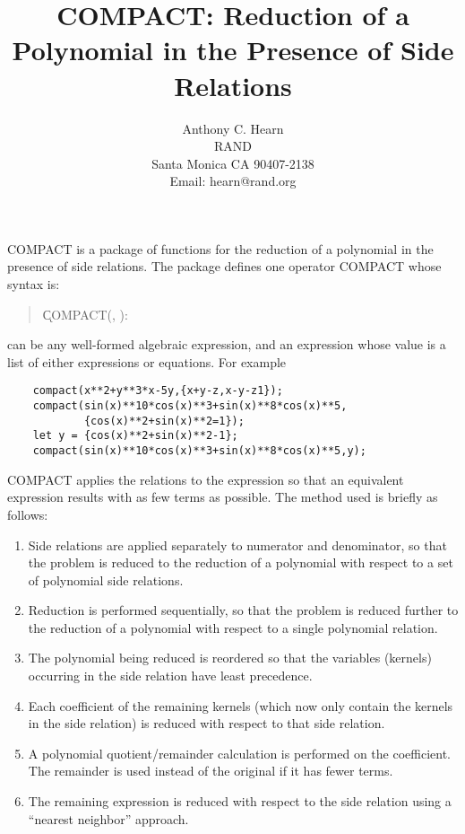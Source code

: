 \title{COMPACT: Reduction of a Polynomial in the Presence of Side Relations}
\date{}
\author{Anthony C. Hearn\\ RAND\\
Santa Monica CA 90407-2138\\
Email: hearn@rand.org}

\maketitle

  
{COMPACT} is a package of functions for the reduction of a polynomial in
the presence of side relations.  The package defines one operator {COMPACT}
whose syntax is:

\begin{quote}
\k{COMPACT}(, ):
\end{quote}

 can be any well-formed algebraic expression, and
 an expression whose value is a list
of either expressions or equations.  For example

\begin{verbatim}
    compact(x**2+y**3*x-5y,{x+y-z,x-y-z1});
    compact(sin(x)**10*cos(x)**3+sin(x)**8*cos(x)**5,
            {cos(x)**2+sin(x)**2=1});
    let y = {cos(x)**2+sin(x)**2-1};
    compact(sin(x)**10*cos(x)**3+sin(x)**8*cos(x)**5,y);
\end{verbatim}

{COMPACT} applies the relations to the expression so that an equivalent
expression results with as few terms as possible.  The method used is
briefly as follows:

\begin{enumerate}
\item Side relations are applied separately to numerator and denominator, so
that the problem is reduced to the reduction of a polynomial with respect to
a set of polynomial side relations.

\item Reduction is performed sequentially, so that the problem is reduced
further to the reduction of a polynomial with respect to a single
polynomial relation.

\item The polynomial being reduced is reordered so that the variables
(kernels) occurring in the side relation have least precedence.

\item Each coefficient of the remaining kernels (which now only contain
the kernels
in the side relation) is reduced with respect to that side relation.

\item A polynomial quotient/remainder calculation is performed on the
coefficient.  The remainder is
used instead of the original if it has fewer terms.

\item The remaining expression is reduced with respect to the side relation
using a ``nearest neighbor'' approach.
\end{enumerate}

